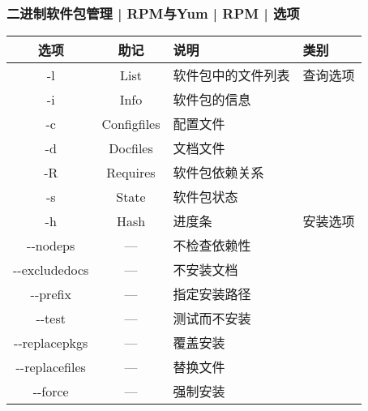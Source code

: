 \begin{frame}[fragile]
  \frametitle{二进制软件包管理 | RPM与Yum | RPM | 选项}
  \begin{table}
    \centering
    \begin{tabularx}{\textwidth}{cclX}
      \hline
      \rowcolor{blue!50}选项 & 助记 & 说明 & 类别\\
      \hline
      -l & List & 软件包中的文件列表 & 查询选项\\
      -i & Info & 软件包的信息 & \\
      -c & Configfiles & 配置文件 & \\
      -d & Docfiles & 文档文件 & \\
      -R & Requires & 软件包依赖关系 & \\
      -s & State & 软件包状态 & \\
      \hline
      -h & Hash & 进度条 & 安装选项\\
      -\!-nodeps & --- & 不检查依赖性 & \\
      -\!-excludedocs & --- & 不安装文档 & \\
      -\!-prefix & --- & 指定安装路径 & \\
      -\!-test & --- & 测试而不安装 & \\
      -\!-replacepkgs & --- & 覆盖安装 & \\
      -\!-replacefiles & --- & 替换文件 & \\
      -\!-force & --- & 强制安装 & \\
      \hline
    \end{tabularx}
  \end{table}
\end{frame}

